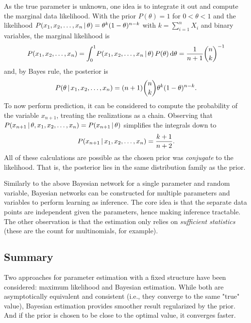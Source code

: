 			As the true parameter is unknown, one idea is to integrate it out and compute the marginal data likelihood. With the prior \( P(\theta) = 1 \) for \( 0 < \theta < 1 \) and the likelihood \( P(x_1, x_2, \dots, x_n \,\vert\, \theta) = \theta^k (1 - \theta)^{n - k} \) with \( k = \sum_{i = 1}^{n} X_i \) and binary variables, the marginal likelihood is
			\begin{equation}
				P(x_1, x_2, \dots, x_n)
				= \int_0^1\! P(x_1, x_2, \dots, x_n \,\vert\, \theta) \, P(\theta) \dd{\theta}
				= \frac{1}{n + 1} { n \choose k }^{-1}
			\end{equation}
			and, by Bayes rule, the posterior is
			\begin{equation}
				P(\theta \,\vert\, x_1, x_2, \dots, x_n)
				= (n + 1) { n \choose k } \theta^k (1 - \theta)^{n - k}.
			\end{equation}
			To now perform prediction, it can be considered to compute the probability of the variable \(x_{n + 1}\), treating the realizations as a chain. Observing that \( P(x_{n + 1} \,\vert\, \theta, x_1, x_2, \dots, x_n) = P(x_{n + 1} \,\vert\, \theta) \) simplifies the integrals down to
			\begin{equation}
				P(x_{n + 1} \,\vert\, x_1, x_2, \dots, x_n) = \frac{k + 1}{n + 2}.
			\end{equation}
			All of these calculations are possible as the chosen prior was \emph{conjugate} to the likelihood. That is, the posterior lies in the same distribution family as the prior.

			Similarly to the above Bayesian network for a single parameter and random variable, Bayesian networks can be constructed for multiple parameters and variables to perform learning as inference. The core idea is that the separate data points are independent given the parameters, hence making inference tractable. The other observation is that the estimation only relies on \emph{sufficient statistics} (these are the count for multinomials, for example).

		\subsection{Summary}
			Two approaches for parameter estimation with a fixed structure have been considered: maximum likelihood and Bayesian estimation. While both are asymptotically equivalent and consistent (i.e., they converge to the same "true" value), Bayesian estimation provides smoother result regularized by the prior. And if the prior is chosen to be close to the optimal value, it converges faster.

